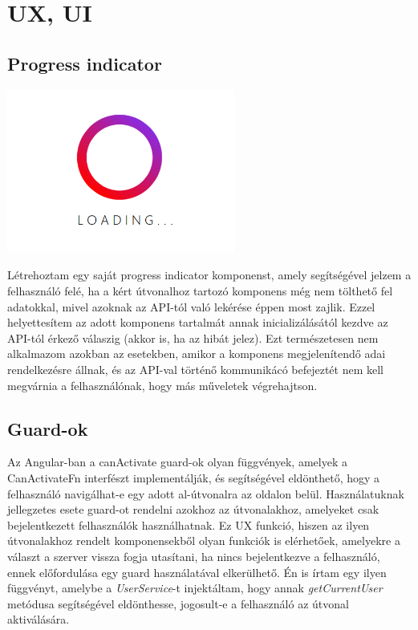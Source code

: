 \documentclass[a4paper,12pt]{report}
\theoremstyle{definition}
\theoremstyle{remark}
\begin{document}
\section{UX, UI}

	\subsection{Progress indicator}

\begin{center}
\includegraphics[width=75mm]{progress_indicator}
\captionsetup{width=0.8\linewidth}
\end{center}

Létrehoztam egy saját progress indicator komponenst, amely segítségével jelzem a felhasználó felé, ha a kért útvonalhoz tartozó komponens még nem tölthető fel adatokkal, mivel azoknak az API-tól való lekérése éppen most zajlik. Ezzel helyettesítem az adott komponens tartalmát annak inicializálásától kezdve az API-tól érkező válaszig (akkor is, ha az hibát jelez). Ezt természetesen nem alkalmazom azokban az esetekben, amikor a komponens megjelenítendő adai rendelkezésre állnak, és az API-val történő kommunikácó befejeztét nem kell megvárnia a felhasználónak, hogy más műveletek végrehajtson.

	\subsection{Guard-ok}

Az Angular-ban a canActivate guard-ok olyan függvények, amelyek a CanActivateFn\cite{Guardwebsite} interfészt implementálják, és segítségével eldönthető, hogy a felhasználó navigálhat-e egy adott al-útvonalra az oldalon belül. Használatuknak jellegzetes esete guard-ot rendelni azokhoz az útvonalakhoz, amelyeket csak bejelentkezett felhasználók használhatnak. Ez UX funkció, hiszen az ilyen útvonalakhoz rendelt komponensekből olyan funkciók is elérhetőek, amelyekre a választ a szerver vissza fogja utasítani, ha nincs bejelentkezve a felhasználó, ennek előfordulása egy guard használatával elkerülhető. Én is írtam egy ilyen függvényt, amelybe a  \textit{UserService}-t injektáltam, hogy annak  \textit{getCurrentUser} metódusa segítségével eldönthesse, jogosult-e a felhasználó az útvonal aktiválására.
\end{document}
